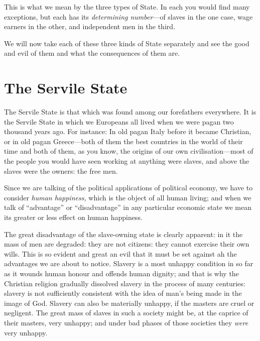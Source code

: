 \documentclass{book}
\begin{document}
This is what we mean by the three types of State. In each you would find many exceptions, but each has its \emph{determining number}—of slaves in the one case, wage earners in the other, and independent men in the third.

We will now take each of these three kinds of State separately and see the good and evil of them and what the consequences of them are.

\chapter*{The Servile State}
\label{chapter-11}
The Servile State is that which was found among our forefathers everywhere. It is the Servile State in which we Europeans all lived when we were pagan two thousand years ago. For instance: In old pagan Italy before it became Christian, or in old pagan Greece—both of them the best countries in the world of their time and both of them, as you know, the origins of our own civilisation—most of the people you would have seen working at anything were slaves, and above the slaves were the owners: the free men.

Since we are talking of the political applications of political economy, we have to consider \emph{human happiness,} which is the object of all human living; and when we talk of “advantage” or “disadvantage” in any particular economic state we mean its greater or less effect on human happiness.

The great disadvantage of the slave-owning state is clearly apparent: in it the mass of men are degraded: they are not citizens: they cannot exercise their own wills. This is so evident and great an evil that it must be set against ah the advantages we are about to notice. Slavery is a most unhappy condition in so far as it wounds human honour and offends human dignity; and that is why the Christian religion gradually dissolved slavery in the process of many centuries: slavery is not sufficiently consistent with the idea of man’s being made in the image of God. Slavery can also be materially unhappy, if the masters are cruel or negligent. The great mass of slaves in such a society might be, at the caprice of their masters, very unhappy; and under bad phases of those societies they \emph{were} very unhappy.
\end{document}
